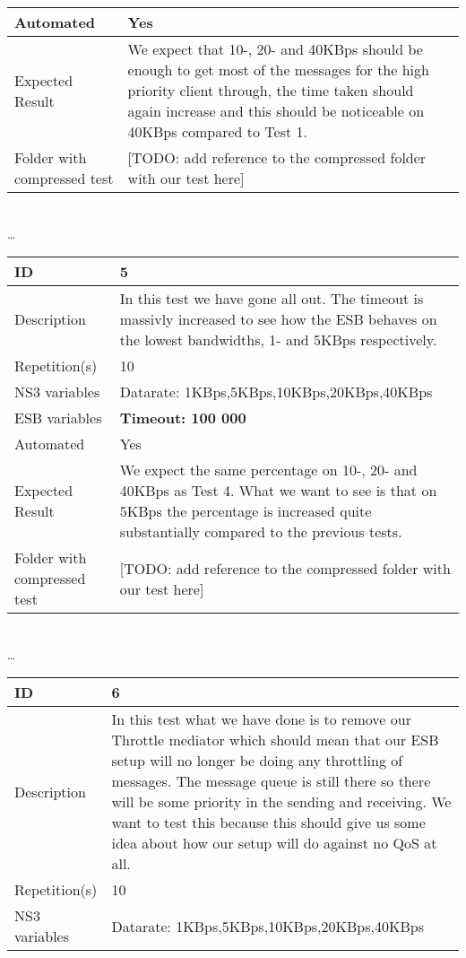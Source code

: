 \begin{center}
\begin{tabular}{| p{4cm} | p{8cm} |}
\hline
Automated & Yes \\
\hline
Expected Result & We expect that 10-, 20- and 40KBps should be enough to get most of the messages for the high priority client through, the time taken should again increase and this should be noticeable on 40KBps compared to Test 1.  \\
\hline
Folder with compressed test & [TODO: add reference to the compressed folder with our test here]\\
\hline
\end{tabular}
\\ \ldots \\
\begin{tabular}{| p{4cm} | p{8cm} |}%
\hline
ID & 5 \\
\hline
Description & In this test we have gone all out. The timeout is massivly increased to see how the ESB behaves on the lowest bandwidths, 1- and 5KBps respectively.  \\
\hline
Repetition(s) & 10 \\
\hline
NS3 variables & Datarate: 1KBps,5KBps,10KBps,20KBps,40KBps \\
\hline
ESB variables & \textbf{Timeout: 100 000} \\
\hline
Automated & Yes \\
\hline
Expected Result & We expect the same percentage on 10-, 20- and 40KBps as Test 4. What we want to see is that on 5KBps the percentage is increased quite substantially compared to the previous tests. \\
\hline
Folder with compressed test & [TODO: add reference to the compressed folder with our test here]\\
\hline
\end{tabular}
\\ \ldots \\
\begin{tabular}{| p{4cm} | p{8cm} |}%
\hline
ID & 6 \\
\hline
Description & In this test what we have done is to remove our Throttle mediator which should mean that our ESB setup will no longer be doing any throttling of messages. The message queue is still there so there will be some priority in the sending and receiving. We want to test this because this should give us some idea about how our setup will do against no QoS at all. \\
\hline
Repetition(s) & 10 \\
\hline
NS3 variables & Datarate: 1KBps,5KBps,10KBps,20KBps,40KBps \\

\end{tabular}
\end{center}
